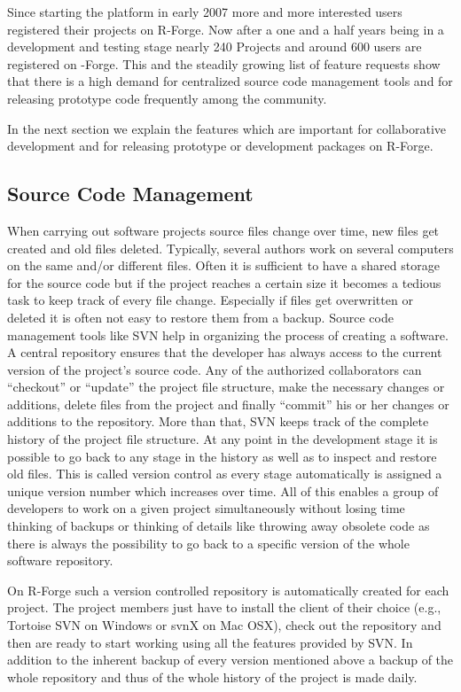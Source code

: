 Since starting the platform in early 2007 more
and more interested users registered their projects on R-Forge. Now
after a one and a half years being in a development and testing stage nearly
240 Projects and around 600  
users are registered on \R{}-Forge. This and the steadily growing list of
feature requests show that there is a high demand for centralized source code
management tools and for releasing prototype code frequently among the
\R{} community.

In the next section we explain the features which are important for
collaborative development and for releasing prototype or development
packages on R-Forge.

\subsection{Source Code Management}

When carrying out software projects source files change over time,
new files get created and old files deleted. Typically, several authors
work on several computers on the same and/or different files. Often it
is sufficient to have a shared storage for the source code but if the
project reaches a certain size it becomes a tedious task to keep track
of every file change. Especially if files get overwritten or deleted it
is often not easy to restore them from a backup. Source
code management tools like SVN help in organizing the process of
creating a software. A central repository ensures that the developer
has always access to the current version of the project's source
code. Any of the authorized collaborators can ``checkout'' or
``update'' the project
file structure, make the necessary changes or additions, delete
files from the project and finally ``commit'' his or her changes or additions
to the repository. More than
that, SVN keeps track of the complete history of the project file
structure. At any point in the development stage it is possible to go
back to any stage in the history as well as to inspect and restore old
files. This is called version control as every stage automatically is
assigned a unique version number which increases over time. 
All of this enables a group of developers to work on a given project
simultaneously without losing time thinking of backups or thinking of
details like throwing away obsolete code as there is always the possibility to 
go back to a specific version of the whole software repository.

On R-Forge such a version controlled repository is automatically
created for each project. The project members just have to install
the client of their choice (e.g., Tortoise SVN on Windows or svnX on
Mac OSX), check out the repository and then are ready to start working
using all the features provided by SVN. In addition to the inherent
backup of every version mentioned above a backup of the whole
repository and thus of the whole history of the project is made daily. 

